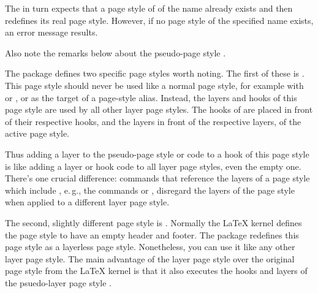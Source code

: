 The  in turn expects that a page style of
of the name  already exists and then redefines its real
page style. However, if no page style of the specified name exists, an error
message results.

Also note the remarks below about the pseudo-page style
.%
\EndIndexGroup


\begin{Declaration}
\end{Declaration}
%
%
The  package defines two specific page styles worth noting.
The first of these is %
. This page style should never be used
like a normal page style, for example with  or
, or as the target of a page-style alias.
Instead, the layers and hooks of this page style are used by all
other layer page styles. The hooks of  are placed in
front of their respective hooks, and the layers in front of the respective
layers, of the active page style.

Thus adding a layer to the pseudo-page style  or code
to a hook of this page style is like adding a layer or hook code to all layer
page styles, even the empty one. There's one crucial difference: commands that
reference the layers of a page style which include
, e.\,g., the commands
 or
, disregard the layers
of the page style  when applied to a different layer
page style.

The second, slightly different page style is . Normally the
\LaTeX{} kernel defines the  page style to have an empty
header and footer. The  package redefines this page style as
a layerless page style. Nonetheless, you can use it like any other layer page
style. The main advantage of the layer page style over the original page
style from the \LaTeX{} kernel is that it also executes the hooks and layers
of the psuedo-layer page style .%
\EndIndexGroup


